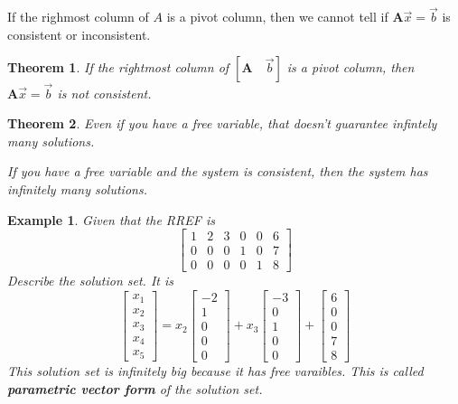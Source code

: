 \documentclass[11pt]{article}
\newtheorem{thm}{Theorem}
\newtheorem{ex}{Example}
\begin{document}
If the righmost column of $A$ is a pivot column, then we cannot tell if $\mathbf{A}\vec{x} = \vec{b}$ is consistent or inconsistent.
\begin{thm}
  If the rightmost column of
  $\left[\mathbf{A} \quad \vec{b}\right]$ is a pivot column, then
  $\mathbf{A}\vec{x} = \vec{b}$ is not consistent.
\end{thm}

\begin{thm}
  Even if you have a free variable, that doesn't guarantee infintely many solutions.

  If you have a free variable and the system is consistent, then the system has infinitely many solutions.
\end{thm}

\begin{ex}
  Given that the RREF is
  \[\begin{bmatrix}
      1 & 2 & 3 & 0 &  0 &  6 \\
      0 & 0 & 0  & 1 & 0 & 7 \\
      0 & 0 & 0 & 0 & 1 & 8\end{bmatrix}\]
  Describe the solution set.
  It is
  \[
    \begin{bmatrix}
      x_{1} \\ x_{2} \\ x_{3} \\ x_{4} \\ x_{5}
    \end{bmatrix}
    =
    x_{2} \begin{bmatrix} -2  \\ 1 \\ 0 \\ 0 \\ 0 \end{bmatrix}
    +
    x_{3} \begin{bmatrix} -3 \\ 0 \\ 1 \\ 0 \\ 0 \end{bmatrix}
    +
    \begin{bmatrix} 6 \\ 0 \\ 0 \\ 7 \\ 8 \end{bmatrix}
  \]
  This solution set is infinitely big because it has free varaibles.
  This is called \textbf{parametric vector form} of the solution set.
\end{ex}
\end{document}
